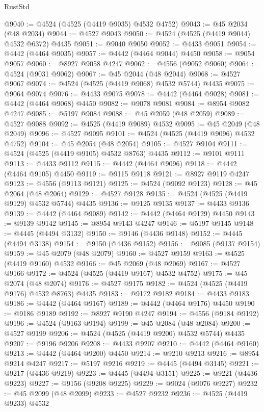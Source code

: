 \begin{lexlean}{RustStd}
\begin{coremodule}
@9040 := @4524 (@4525 (@4419 @9035) @4532 @4752)
@9043 := @45 @2034 (@48 @2034)
@9044 := @4527 @9043
@9050 := @4524 (@4525 (@4419 @9044) @4532 @6372) @4435
@9051 := @9040 @9050
@9052 := @4433 @9051
@9054 := @4442 (@4464 @9035)
@9057 := @4442 (@4464 @9044) @4450
@9058 := @9054 @9057
@9060 := @8927 @9058 @4247
@9062 := @4556 (@9052 @9060)
@9064 := @4524 (@9031 @9062)
@9067 := @45 @2044 (@48 @2044)
@9068 := @4527 @9067
@9074 := @4524 (@4525 (@4419 @9068) @4532 @5744) @4435
@9075 := @9064 @9074
@9076 := @4433 @9075
@9078 := @4442 (@4464 @9028)
@9081 := @4442 (@4464 @9068) @4450
@9082 := @9078 @9081
@9084 := @8954 @9082 @4247
@9085 := @5197 @9084
@9088 := @45 @2059 (@48 @2059)
@9089 := @4527 @9088
@9092 := @4525 (@4419 @9089) @4532
@9095 := @45 @2049 (@48 @2049)
@9096 := @4527 @9095
@9101 := @4524 (@4525 (@4419 @9096) @4532 @4752)
@9104 := @45 @2054 (@48 @2054)
@9105 := @4527 @9104
@9111 := @4524 (@4525 (@4419 @9105) @4532 @8763) @4435
@9112 := @9101 @9111
@9113 := @4433 @9112
@9115 := @4442 (@4464 @9096)
@9118 := @4442 (@4464 @9105) @4450
@9119 := @9115 @9118
@9121 := @8927 @9119 @4247
@9123 := @4556 (@9113 @9121)
@9125 := @4524 (@9092 @9123)
@9128 := @45 @2064 (@48 @2064)
@9129 := @4527 @9128
@9135 := @4524 (@4525 (@4419 @9129) @4532 @5744) @4435
@9136 := @9125 @9135
@9137 := @4433 @9136
@9139 := @4442 (@4464 @9089)
@9142 := @4442 (@4464 @9129) @4450
@9143 := @9139 @9142
@9145 := @8954 @9143 @4247
@9146 := @5197 @9145
@9148 := @4445 (@4494 @3132)
@9150 := @9146 (@4436 @9148)
@9152 := @4445 (@4494 @3138)
@9154 := @9150 (@4436 @9152)
@9156 := @9085 (@9137 @9154)
@9159 := @45 @2079 (@48 @2079)
@9160 := @4527 @9159
@9163 := @4525 (@4419 @9160) @4532
@9166 := @45 @2069 (@48 @2069)
@9167 := @4527 @9166
@9172 := @4524 (@4525 (@4419 @9167) @4532 @4752)
@9175 := @45 @2074 (@48 @2074)
@9176 := @4527 @9175
@9182 := @4524 (@4525 (@4419 @9176) @4532 @8763) @4435
@9183 := @9172 @9182
@9184 := @4433 @9183
@9186 := @4442 (@4464 @9167)
@9189 := @4442 (@4464 @9176) @4450
@9190 := @9186 @9189
@9192 := @8927 @9190 @4247
@9194 := @4556 (@9184 @9192)
@9196 := @4524 (@9163 @9194)
@9199 := @45 @2084 (@48 @2084)
@9200 := @4527 @9199
@9206 := @4524 (@4525 (@4419 @9200) @4532 @5744) @4435
@9207 := @9196 @9206
@9208 := @4433 @9207
@9210 := @4442 (@4464 @9160)
@9213 := @4442 (@4464 @9200) @4450
@9214 := @9210 @9213
@9216 := @8954 @9214 @4247
@9217 := @5197 @9216
@9219 := @4445 (@4494 @3145)
@9221 := @9217 (@4436 @9219)
@9223 := @4445 (@4494 @3151)
@9225 := @9221 (@4436 @9223)
@9227 := @9156 (@9208 @9225)
@9229 := @9024 (@9076 @9227)
@9232 := @45 @2099 (@48 @2099)
@9233 := @4527 @9232
@9236 := @4525 (@4419 @9233) @4532

\end{coremodule}
\end{lexlean}

